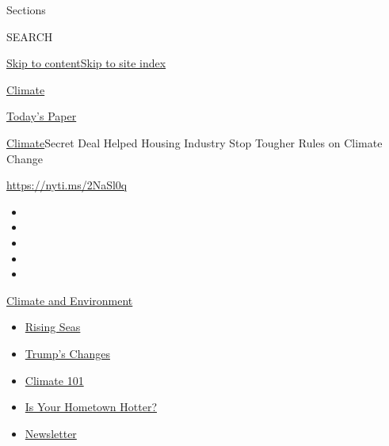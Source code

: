 Sections

SEARCH

\protect\hyperlink{site-content}{Skip to
content}\protect\hyperlink{site-index}{Skip to site index}

\href{https://www.nytimes.com/section/climate}{Climate}

\href{https://myaccount.nytimes.com/auth/login?response_type=cookie\&client_id=vi}{}

\href{https://www.nytimes.com/section/todayspaper}{Today's Paper}

\href{/section/climate}{Climate}\textbar{}Secret Deal Helped Housing
Industry Stop Tougher Rules on Climate Change

\url{https://nyti.ms/2NaSl0q}

\begin{itemize}
\item
\item
\item
\item
\item
\end{itemize}

\href{https://www.nytimes.com/section/climate?action=click\&pgtype=Article\&state=default\&region=TOP_BANNER\&context=storylines_menu}{Climate
and Environment}

\begin{itemize}
\tightlist
\item
  \href{https://www.nytimes.com/2020/07/30/climate/sea-level-inland-floods.html?action=click\&pgtype=Article\&state=default\&region=TOP_BANNER\&context=storylines_menu}{Rising
  Seas}
\item
  \href{https://www.nytimes.com/interactive/2020/climate/trump-environment-rollbacks.html?action=click\&pgtype=Article\&state=default\&region=TOP_BANNER\&context=storylines_menu}{Trump's
  Changes}
\item
  \href{https://www.nytimes.com/interactive/2020/04/19/climate/climate-crash-course-1.html?action=click\&pgtype=Article\&state=default\&region=TOP_BANNER\&context=storylines_menu}{Climate
  101}
\item
  \href{https://www.nytimes.com/interactive/2018/08/30/climate/how-much-hotter-is-your-hometown.html?action=click\&pgtype=Article\&state=default\&region=TOP_BANNER\&context=storylines_menu}{Is
  Your Hometown Hotter?}
\item
  \href{https://www.nytimes.com/newsletters/climate-change?action=click\&pgtype=Article\&state=default\&region=TOP_BANNER\&context=storylines_menu}{Newsletter}
\end{itemize}

